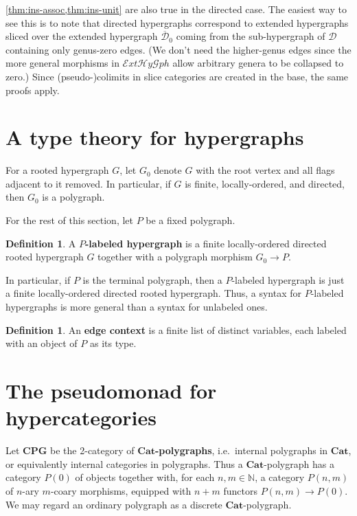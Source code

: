 \documentclass{article}
\theoremstyle{definition}
\newtheorem{defn}[thm]{Definition}
\theoremstyle{remark}
\def\Cat{\ensuremath{\mathbf{Cat}}}
\def\cpg{\ensuremath{\mathbf{CPG}}\xspace}
\def\N{\mathbb{N}}
\def\dhy{\mathcal{D}}
\def\ehy{\mathcal{E}\mathit{xt}\mathcal{H}\mathit{y}\mathcal{G}\mathit{ph}}
\def\dhybar{\overline{\mathcal{D}}}
\begin{document}
\cref{thm:ins-assoc,thm:ins-unit} are also true in the directed case.
The easiest way to see this is to note that directed hypergraphs correspond to extended hypergraphs sliced over the extended hypergraph $\dhybar_0$ coming from the sub-hypergraph of $\dhy$ containing only genus-zero edges.
(We don't need the higher-genus edges since the more general morphisms in $\ehy$ allow arbitrary genera to be collapsed to zero.)
Since (pseudo-)colimits in slice categories are created in the base, the same proofs apply.


\section{A type theory for hypergraphs}
\label{sec:graphs-type-theory}

For a rooted hypergraph $G$, let $G_0$ denote $G$ with the root vertex and all flags adjacent to it removed.
In particular, if $G$ is finite, locally-ordered, and directed, then $G_0$ is a polygraph.

For the rest of this section, let $P$ be a fixed polygraph.

\begin{defn}
  A \textbf{$P$-labeled hypergraph} is a finite locally-ordered directed rooted hypergraph $G$ together with a polygraph morphism $G_0\to P$.
\end{defn}

In particular, if $P$ is the terminal polygraph, then a $P$-labeled hypergraph is just a finite locally-ordered directed rooted hypergraph.
Thus, a syntax for $P$-labeled hypergraphs is more general than a syntax for unlabeled ones.

\begin{defn}
  An \textbf{edge context} is a finite list of distinct variables, each labeled with an object of $P$ as its type.
\end{defn}


\section{The pseudomonad for hypercategories}
\label{sec:hypercats}

Let \cpg be the 2-category of \textbf{\Cat-polygraphs}, i.e.\ internal polygraphs in \Cat, or equivalently internal categories in polygraphs.
Thus a \Cat-polygraph has a category $P(0)$ of objects together with, for each $n,m\in\N$, a category $P(n,m)$ of $n$-ary $m$-coary morphisms, equipped with $n+m$ functors $P(n,m) \to P(0)$.
We may regard an ordinary polygraph as a discrete \Cat-polygraph.
\end{document}
